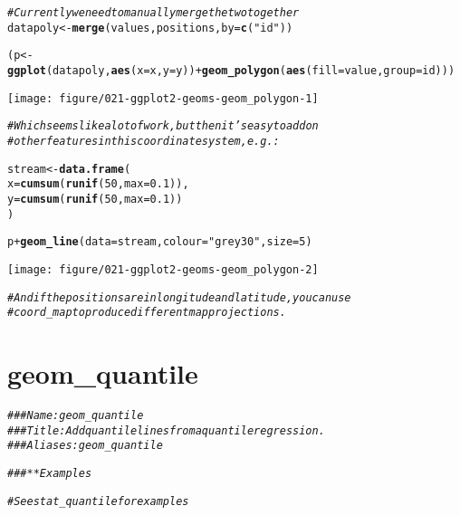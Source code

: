 \documentclass[a4paper,titlepage]{tufte-handout}\usepackage[]{graphicx}\usepackage[]{color}
\makeatletter
\def\maxwidth{ %
  \ifdim\Gin@nat@width>\linewidth
    \linewidth
  \else
    \Gin@nat@width
  \fi
}
\newcommand{\hlnum}[1]{\textcolor[rgb]{0.686,0.059,0.569}{#1}}%
\newcommand{\hlstr}[1]{\textcolor[rgb]{0.192,0.494,0.8}{#1}}%
\newcommand{\hlcom}[1]{\textcolor[rgb]{0.678,0.584,0.686}{\textit{#1}}}%
\newcommand{\hlopt}[1]{\textcolor[rgb]{0,0,0}{#1}}%
\newcommand{\hlstd}[1]{\textcolor[rgb]{0.345,0.345,0.345}{#1}}%
\newcommand{\hlkwb}[1]{\textcolor[rgb]{0.69,0.353,0.396}{#1}}%
\newcommand{\hlkwc}[1]{\textcolor[rgb]{0.333,0.667,0.333}{#1}}%
\newcommand{\hlkwd}[1]{\textcolor[rgb]{0.737,0.353,0.396}{\textbf{#1}}}%
\newenvironment{kframe}{%
 \def\at@end@of@kframe{}%
 \ifinner\ifhmode%
  \def\at@end@of@kframe{\end{minipage}}%
  \begin{minipage}{\columnwidth}%
 \fi\fi%
 \def\FrameCommand##1{\hskip\@totalleftmargin \hskip-\fboxsep
 \colorbox{shadecolor}{##1}\hskip-\fboxsep
     \hskip-\linewidth \hskip-\@totalleftmargin \hskip\columnwidth}%
 \MakeFramed {\advance\hsize-\width
   \@totalleftmargin\z@ \linewidth\hsize
   \@setminipage}}%
 {\par\unskip\endMakeFramed%
 \at@end@of@kframe}
\newenvironment{knitrout}{}{} %
\makeatother
\begin{document}
\begin{knitrout}
\begin{kframe}
\begin{alltt}
\hlcom{# Currently we need to manually merge the two together}
\hlstd{datapoly} \hlkwb{<-} \hlkwd{merge}\hlstd{(values, positions,} \hlkwc{by}\hlstd{=}\hlkwd{c}\hlstd{(}\hlstr{"id"}\hlstd{))}

\hlstd{(p} \hlkwb{<-} \hlkwd{ggplot}\hlstd{(datapoly,} \hlkwd{aes}\hlstd{(}\hlkwc{x}\hlstd{=x,} \hlkwc{y}\hlstd{=y))} \hlopt{+} \hlkwd{geom_polygon}\hlstd{(}\hlkwd{aes}\hlstd{(}\hlkwc{fill}\hlstd{=value,} \hlkwc{group}\hlstd{=id)))}
\end{alltt}
\end{kframe}
\texttt{[image: figure/021-ggplot2-geoms-geom\_polygon-1]} 
\begin{kframe}\begin{alltt}
\hlcom{# Which seems like a lot of work, but then it's easy to add on}
\hlcom{# other features in this coordinate system, e.g.:}

\hlstd{stream} \hlkwb{<-} \hlkwd{data.frame}\hlstd{(}
  \hlkwc{x} \hlstd{=} \hlkwd{cumsum}\hlstd{(}\hlkwd{runif}\hlstd{(}\hlnum{50}\hlstd{,} \hlkwc{max} \hlstd{=} \hlnum{0.1}\hlstd{)),}
  \hlkwc{y} \hlstd{=} \hlkwd{cumsum}\hlstd{(}\hlkwd{runif}\hlstd{(}\hlnum{50}\hlstd{,}\hlkwc{max} \hlstd{=} \hlnum{0.1}\hlstd{))}
\hlstd{)}

\hlstd{p} \hlopt{+} \hlkwd{geom_line}\hlstd{(}\hlkwc{data} \hlstd{= stream,} \hlkwc{colour}\hlstd{=}\hlstr{"grey30"}\hlstd{,} \hlkwc{size} \hlstd{=} \hlnum{5}\hlstd{)}
\end{alltt}
\end{kframe}
\texttt{[image: figure/021-ggplot2-geoms-geom\_polygon-2]} 
\begin{kframe}\begin{alltt}
\hlcom{# And if the positions are in longitude and latitude, you can use}
\hlcom{# coord_map to produce different map projections.}
\end{alltt}
\end{kframe}
\end{knitrout}


\section{geom\_quantile}

\begin{knitrout}
\color{fgcolor}\begin{kframe}
\begin{alltt}
\hlcom{### Name: geom_quantile}
\hlcom{### Title: Add quantile lines from a quantile regression.}
\hlcom{### Aliases: geom_quantile}

\hlcom{### ** Examples}

\hlcom{# See stat_quantile for examples}
\end{alltt}
\end{kframe}
\end{knitrout}
\end{document}
